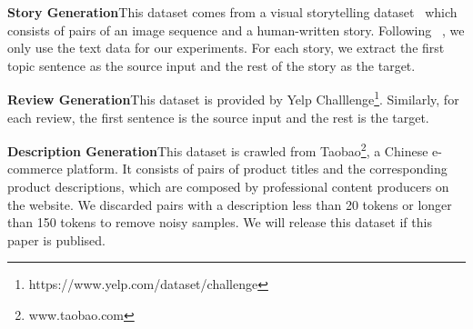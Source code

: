 \documentclass[letterpaper]{article} %
\begin{document}
\medskip\noindent\textbf{Story Generation}\hspace{1em}This dataset comes from a visual storytelling dataset~\cite{huang-et-al:visualstory} which consists of pairs of an image sequence and a human-written story. 
Following ~\citet{xu-et-al:skeleton_jingjingxu_emnlp8}, we only use the text data for our experiments.
For each story, we extract the first topic sentence as the source input and the rest of the story as the target. 

\medskip\noindent\textbf{Review Generation}\hspace{1em}This dataset is provided by Yelp
Challlenge\footnote{https://www.yelp.com/dataset/challenge}.
Similarly, for each review, the first sentence is the source input and the rest is the target.

\medskip\noindent\textbf{Description Generation}\hspace{1em}This dataset is crawled from Taobao\footnote{www.taobao.com}, 
a Chinese e-commerce platform. It consists of pairs of product titles and the corresponding product descriptions, which are composed by professional content producers on the website. We discarded pairs with a description less than 20 tokens or longer than 150 tokens to remove noisy samples. We will release this dataset if this paper is publised.%


\end{document}
